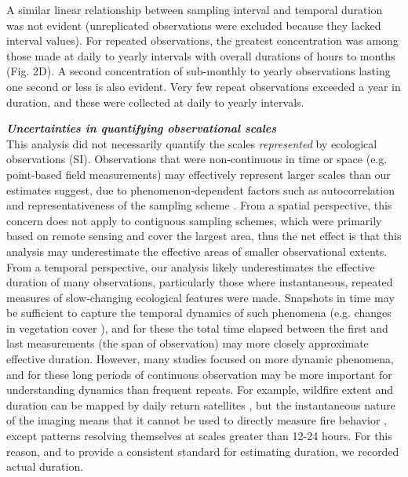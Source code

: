 \documentclass[12pt]{article}
\begin{document}
A similar linear relationship between sampling interval and temporal duration was not evident (unreplicated observations were excluded because they lacked interval values). For repeated observations, the greatest concentration was among those made at daily to yearly intervals with overall durations of hours to months (Fig. 2D). A second concentration of sub-monthly to yearly observations lasting one second or less is also evident. Very few repeat observations exceeded a year in duration, and these were collected at daily to yearly intervals. 

\noindent \textbf{\emph{Uncertainties in quantifying observational scales}}\\
This analysis did not necessarily quantify the scales \emph{represented} by ecological observations (SI). Observations that were non-continuous in time or space (e.g. point-based field measurements) may effectively represent larger scales than our estimates suggest, due to phenomenon-dependent factors such as autocorrelation and representativeness of the sampling scheme \cite{underwood_experiments_1997, palmer_scale_1994,cao_comparison_2002, legendre_spatial_1993,collins_method_2000-1}. From a spatial perspective, this concern does not apply to contiguous sampling schemes, which were primarily based on remote sensing and cover the largest area, thus the net effect is that this analysis may underestimate the effective areas of smaller observational extents. From a temporal perspective, our analysis likely underestimates the effective duration of many observations, particularly those where instantaneous, repeated measures of slow-changing ecological features were made. Snapshots in time may be sufficient to capture the temporal dynamics of such phenomena (e.g. changes in vegetation cover \cite{hansen_high-resolution_2013}), and for these the total time elapsed between the first and last measurements (the span of observation) may more closely approximate effective duration. However, many studies focused on more dynamic phenomena, and for these long periods of continuous observation may be more important for understanding dynamics than frequent repeats. For example, wildfire extent and duration can be mapped by daily return satellites \cite{roy_prototyping_2005,jones_fire_2009}, but the instantaneous nature of the imaging means that it cannot be used to directly measure fire behavior \cite{clements_observing_2007}, except patterns resolving themselves at scales greater than 12-24 hours. For this reason, and to provide a consistent standard for estimating duration, we recorded actual duration. 
\end{document}
